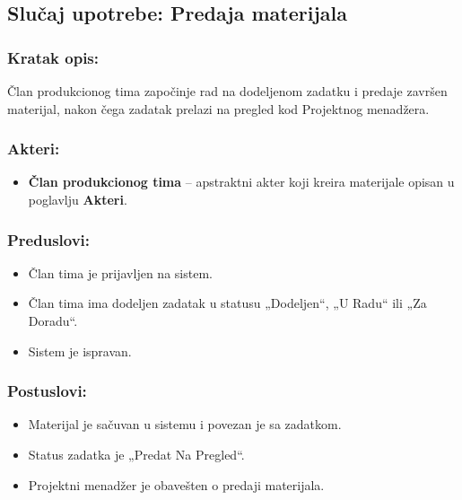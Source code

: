 \subsection{Slučaj upotrebe: Predaja materijala}

\subsubsection*{Kratak opis:}

Član produkcionog tima započinje rad na dodeljenom zadatku i predaje završen materijal, nakon čega zadatak prelazi na pregled kod Projektnog menadžera.

\subsubsection*{Akteri:}
\begin{itemize}
	\item \textbf{Član produkcionog tima} -- apstraktni akter koji kreira materijale opisan u poglavlju \textbf{Akteri}.
\end{itemize}

\subsubsection*{Preduslovi:}
\begin{itemize}
	\item Član tima je prijavljen na sistem.
	\item Član tima ima dodeljen zadatak u statusu „Dodeljen“, „U Radu“ ili „Za Doradu“.
	\item Sistem je ispravan.
\end{itemize}

\subsubsection*{Postuslovi:}
\begin{itemize}
	\item Materijal je sačuvan u sistemu i povezan je sa zadatkom.
	\item Status zadatka je „Predat Na Pregled“.
	\item Projektni menadžer je obavešten o predaji materijala.
\end{itemize}

